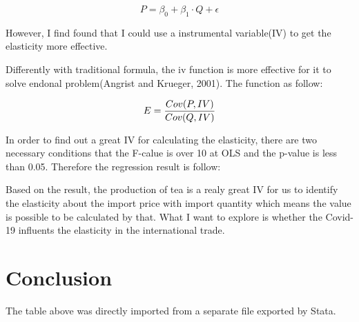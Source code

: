 \documentclass[12pt]{article}
\begin{document}
$$P = \beta_0 + \beta_1 \cdot Q + \epsilon$$

However, I find found that I could use a instrumental variable(IV) to get the elasticity more effective.

Differently with traditional formula, the iv function is more effective for it to solve endonal problem(Angrist and Krueger, 2001). The function as follow:

$$E = {Cov(P, IV) \over Cov(Q, IV)}$$

In order to find out a great IV for calculating the elasticity, there are two necessary conditions that the F-calue is over 10 at OLS and the p-value is less than 0.05.
Therefore the regression result is follow:


Based on the result, the production of tea is a realy great IV for us to identify the elasticity about the import price with import quantity which means the value is possible to be calculated by that.
What I want to explore is whether the Covid-19 influents the elasticity in the international trade.



\section{Conclusion}
The table above was directly imported from a separate file exported by Stata.
\end{document}
